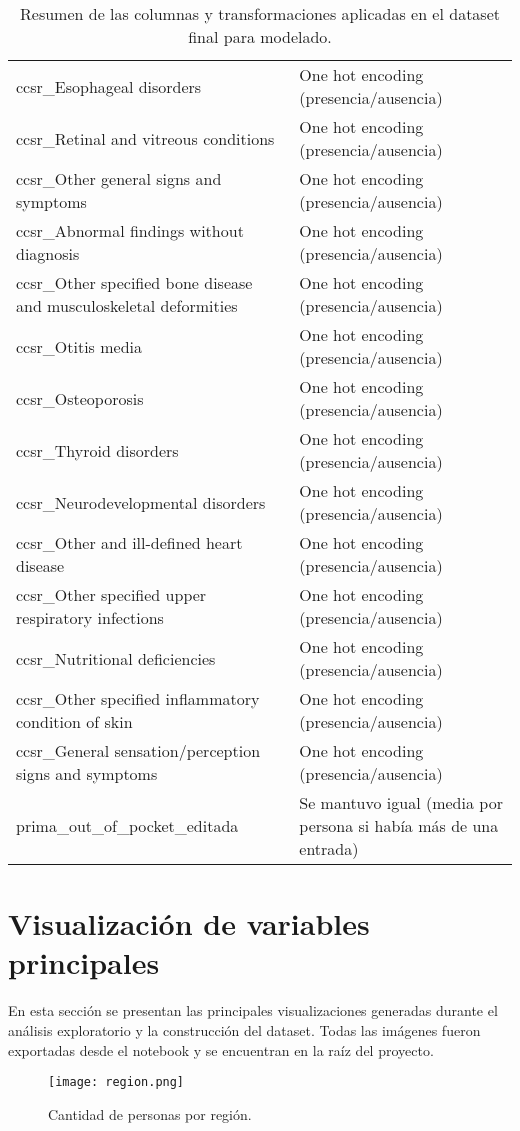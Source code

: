 \documentclass[12pt,a4paper]{article}
\begin{document}
\begin{itemize}
\begin{table}[H]
\begin{tabular}{ll}
ccsr\_Esophageal disorders & One hot encoding (presencia/ausencia) \\
ccsr\_Retinal and vitreous conditions & One hot encoding (presencia/ausencia) \\
ccsr\_Other general signs and symptoms & One hot encoding (presencia/ausencia) \\
ccsr\_Abnormal findings without diagnosis & One hot encoding (presencia/ausencia) \\
ccsr\_Other specified bone disease and musculoskeletal deformities & One hot encoding (presencia/ausencia) \\
ccsr\_Otitis media & One hot encoding (presencia/ausencia) \\
ccsr\_Osteoporosis & One hot encoding (presencia/ausencia) \\
ccsr\_Thyroid disorders & One hot encoding (presencia/ausencia) \\
ccsr\_Neurodevelopmental disorders & One hot encoding (presencia/ausencia) \\
ccsr\_Other and ill-defined heart disease & One hot encoding (presencia/ausencia) \\
ccsr\_Other specified upper respiratory infections & One hot encoding (presencia/ausencia) \\
ccsr\_Nutritional deficiencies & One hot encoding (presencia/ausencia) \\
ccsr\_Other specified inflammatory condition of skin & One hot encoding (presencia/ausencia) \\
ccsr\_General sensation/perception signs and symptoms & One hot encoding (presencia/ausencia) \\
prima\_out\_of\_pocket\_editada & Se mantuvo igual (media por persona si había más de una entrada) \\
\bottomrule
\end{tabular}
\caption{Resumen de las columnas y transformaciones aplicadas en el dataset final para modelado.}
\end{table}

\section*{Visualización de variables principales}
\indent En esta sección se presentan las principales visualizaciones generadas durante el análisis exploratorio y la construcción del dataset. Todas las imágenes fueron exportadas desde el notebook y se encuentran en la raíz del proyecto.

\begin{figure}[H]
    \centering
    \texttt{[image: region.png]}
    \caption{Cantidad de personas por región.}
\end{figure}


\end{itemize}
\end{document}
